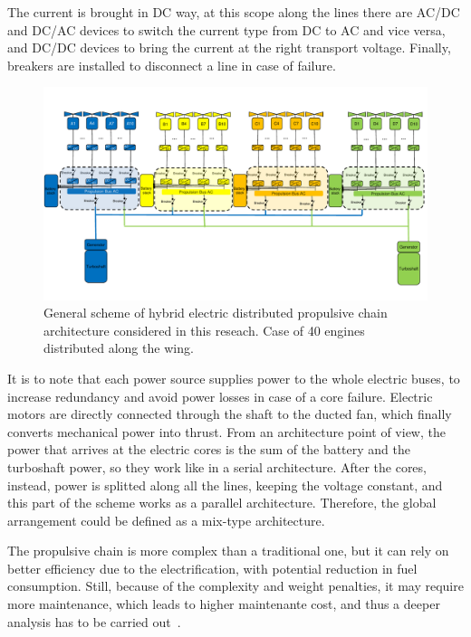 The current is brought in DC way, at this scope along the lines there are AC/DC and DC/AC devices to switch the current type from DC to AC and vice versa, and DC/DC devices to bring the current at the right transport voltage. 
Finally, breakers are installed to disconnect a line in case of failure.
\begin{figure}[h!]
	\centering
	\includegraphics[keepaspectratio, width=\textwidth]{images/chap3/dep_scheme}
	\caption{General scheme of hybrid electric distributed propulsive chain architecture considered in this reseach. Case of 40 engines distributed along the wing.}
	\label{fig:dep_scheme}
\end{figure}

It is to note that each power source supplies power to the whole electric buses, to increase redundancy and avoid power losses in case of a core failure. 
Electric motors are directly connected through the shaft to the ducted fan, which finally converts mechanical power into thrust.
From an architecture point of view, the power that arrives at the electric cores is the sum of the battery and the turboshaft power, so they work like in a serial architecture. 
After the cores, instead, power is splitted along all the lines, keeping the voltage constant, and this part of the scheme works as a parallel architecture. 
Therefore, the global arrangement could be defined as a mix-type architecture. 

The propulsive chain is more complex than a traditional one, but it can rely on better efficiency due to the electrification, with potential reduction in fuel consumption. 
Still, because of the complexity and weight penalties, it may require more maintenance, which leads to higher maintenante cost, and thus a deeper analysis has to be carried out~\cite{bib:pornet_cost}. 

